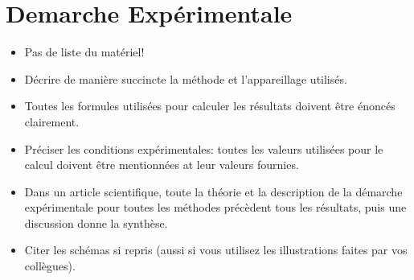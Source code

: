 \section{Demarche Expérimentale}

\begin{itemize}
\item Pas de liste du matériel!
\item Décrire de manière succincte la méthode et l'appareillage utilisés. 
\item Toutes les formules utilisées pour calculer les résultats doivent être énoncés clairement.
\item Préciser les conditions expérimentales: toutes les valeurs utilisées pour le calcul doivent être mentionnées at leur valeurs fournies.
\item Dans un article scientifique, toute la théorie et la description de la démarche expérimentale pour toutes les méthodes précèdent tous les résultats, puis une discussion donne la synthèse.
\item Citer les schémas si repris (aussi si vous utilisez les illustrations faites par vos collègues).
\end{itemize}